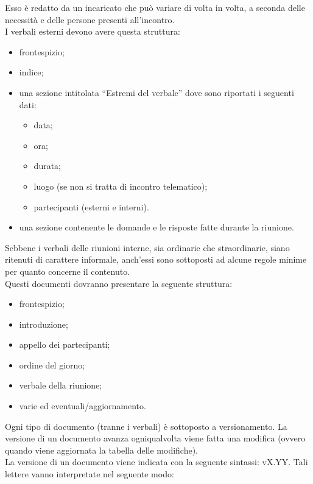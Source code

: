 						Esso è redatto da un incaricato che può variare di volta in volta, a seconda delle necessità e delle persone presenti all’incontro.\\
						I verbali esterni devono avere questa struttura:
						\begin{itemize}
							\item frontespizio;
							\item indice;
							\item una sezione intitolata “Estremi del verbale” dove sono riportati i seguenti dati:
							\begin{itemize}
								\item data;
								\item ora;
								\item durata;
								\item luogo (se non si tratta di incontro telematico);
								\item partecipanti (esterni e interni).
							\end{itemize}
							\item una sezione contenente le domande e le risposte fatte durante la riunione.
						\end{itemize}
						Sebbene i verbali delle riunioni interne, sia ordinarie che straordinarie, siano ritenuti di carattere informale, anch'essi sono sottoposti ad alcune regole minime per quanto concerne il contenuto.  \\
						Questi documenti dovranno presentare la seguente struttura:
						\begin{itemize}
							\item frontespizio;
							\item introduzione;
							\item appello dei partecipanti;
							\item ordine del giorno;
							\item verbale della riunione;
							\item varie ed eventuali/aggiornamento.
						\end{itemize}
			 \label{sec:versioni}
				Ogni tipo di documento (tranne i verbali) è sottoposto a versionamento. La versione di un documento avanza ogniqualvolta viene fatta una modifica (ovvero quando viene aggiornata la tabella delle modifiche).\\
				La versione di un documento viene indicata con la seguente sintassi: vX.YY. Tali lettere vanno interpretate nel seguente modo:
